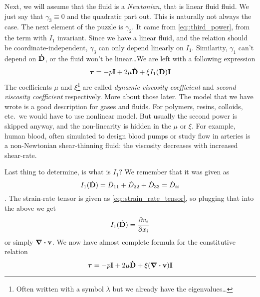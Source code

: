 \documentclass{article}
\begin{document}
Next, we will assume that the fluid is a \emph{Newtonian}, that is linear fluid
fluid. We just say that \(\gamma_3 \equiv 0\) and  the quadratic part out. This is naturally not always the
case. The next element of the puzzle is \(\gamma_2\). It came from 
\autoref{eq::third_power}, from the term with \(I_1\) invariant. Since we have a 
linear fluid, and the relation should be coordinate-independent, \(\gamma_3\) can
only depend linearly on \(I_1\). Similarity, \(\gamma_1\) can't depend on 
\(\vb{\dot{D}}\), or the fluid won't be linear\dots We are left with a following
expression
\begin{equation}
  \bm{\tau} = -p\vb{I} +  2\mu\vb{\dot{D}} + \xi I_1(\dot{\vb{D}}) \vb{I}
\end{equation}
The coefficients \(\mu\) and \(\xi\)\footnote{Often written with a symbol 
\(\lambda\) but we already have the eigenvalues\dots} are called 
\emph{dynamic viscosity coefficient} and \emph{second viscosity coefficient} 
respectively. More about those later. The model that we have wrote is a good 
description for gases and  fluids. For polymers, resins, colloids,
etc.\ we would have to use nonlinear model. But usually the second power is 
skipped anyway, and the non-linearity is hidden in the \(\mu\) or \(\xi\). 
For example, human blood, often simulated to design blood pumps or study flow 
in arteries is a non-Newtonian shear-thinning fluid: the viscosity decreases 
with increased shear-rate.

Last thing to determine, is what is \(I_1\)? We remember that it was given as 
\[
I_1(\dot{\vb{D}}) = \dot{D}_{11} + \dot{D}_{22} + \dot{D}_{33} =
\dot{D}_{ii}\].
The strain-rate tensor is given as \autoref{eq::strain_rate_tensor}, so 
plugging that into the above we get 
\[
  I_1(\dot{\vb{D}}) = \pdv{v_i}{x_i} 
\]
or simply \(\div\vb{v}\). We now have almost complete formula for the 
constitutive relation
\begin{equation*}
  \bm{\tau} = -p\vb{I} +  2\mu\vb{\dot{D}} + \xi (\div\vb{v}) \vb{I}
\end{equation*}
\end{document}
